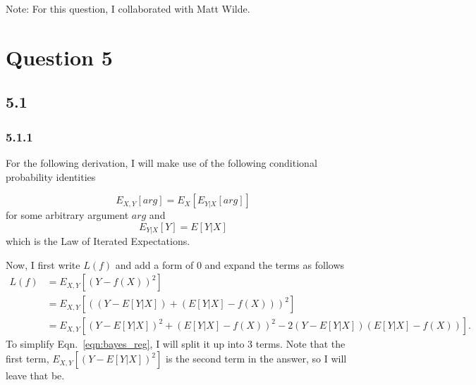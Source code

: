 \documentclass[12pt]{amsart}
\begin{document}
Note: For this question, I collaborated with Matt Wilde.


\section*{Question 5}

\subsection*{5.1}

\subsubsection*{5.1.1}

For the following derivation, I will make use of the following conditional probability identities

\begin{equation} \label{eqn:exp_rule_1}
E_{X,Y}[arg] = E_{X}[E_{Y|X}[arg]]
\end{equation}
for some arbitrary argument $arg$ and 
\begin{equation} \label{eqn:exp_rule_2}
E_{Y|X}[Y] = E[Y|X]
\end{equation}
which is the Law of Iterated Expectations.

Now, I first write $L(f)$ and add a form of 0 and expand the terms as follows
\begin{equation} \label{eqn:bayes_reg}
\begin{split}
L(f) & = E_{X,Y}[(Y - f(X))^2] \\
& = E_{X,Y}[((Y - E[Y|X]) + (E[Y|X] - f(X)))^2] \\
& = E_{X,Y}[(Y - E[Y|X])^2 + (E[Y|X] - f(X))^2 - 2(Y - E[Y|X])(E[Y|X] - f(X))] .
\end{split}
\end{equation}
To simplify Eqn.~\ref{eqn:bayes_reg}, I will split it up into 3 terms.  Note that the first term, $E_{X,Y}[(Y - E[Y|X])^2]$ is the second term in the answer, so I will leave that be.  
\end{document}
